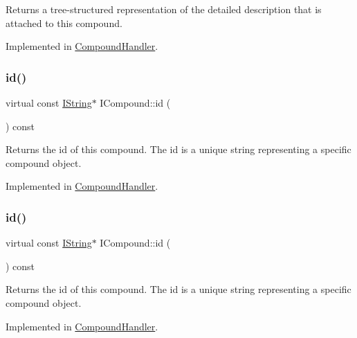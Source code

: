 Returns a tree-\/structured representation of the detailed description that is attached to this compound. 

Implemented in \mbox{\hyperlink{class_compound_handler_a59b5dcb1da507d212bfc09323832a7b5}{Compound\+Handler}}.

\mbox{\label{class_i_compound_ac5c371dee7e65324518532b0a58c2d9f}} 
\subsubsection{\texorpdfstring{id()}{id()}\hspace{0.1cm}{\footnotesize\ttfamily [1/2]}}
{\footnotesize\ttfamily virtual const \mbox{\hyperlink{class_i_string}{I\+String}}$\ast$ I\+Compound\+::id (\begin{DoxyParamCaption}{ }\end{DoxyParamCaption}) const\hspace{0.3cm}{\ttfamily [pure virtual]}}

Returns the id of this compound. The id is a unique string representing a specific compound object. 

Implemented in \mbox{\hyperlink{class_compound_handler_ae9331f707437a480334f55471922ae13}{Compound\+Handler}}.

\mbox{\label{class_i_compound_ac5c371dee7e65324518532b0a58c2d9f}} 
\subsubsection{\texorpdfstring{id()}{id()}\hspace{0.1cm}{\footnotesize\ttfamily [2/2]}}
{\footnotesize\ttfamily virtual const \mbox{\hyperlink{class_i_string}{I\+String}}$\ast$ I\+Compound\+::id (\begin{DoxyParamCaption}{ }\end{DoxyParamCaption}) const\hspace{0.3cm}{\ttfamily [pure virtual]}}

Returns the id of this compound. The id is a unique string representing a specific compound object. 

Implemented in \mbox{\hyperlink{class_compound_handler_ae9331f707437a480334f55471922ae13}{Compound\+Handler}}.

